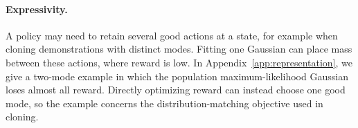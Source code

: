 

\paragraph{Expressivity.} A policy may need to retain several good actions at a state, for example when cloning demonstrations with distinct modes. Fitting one Gaussian can place mass between these actions, where reward is low. In Appendix~\ref{app:representation}, we give a two-mode example in which the population maximum-likelihood Gaussian loses almost all reward. Directly optimizing reward can instead choose one good mode, so the example concerns the distribution-matching objective used in cloning.

